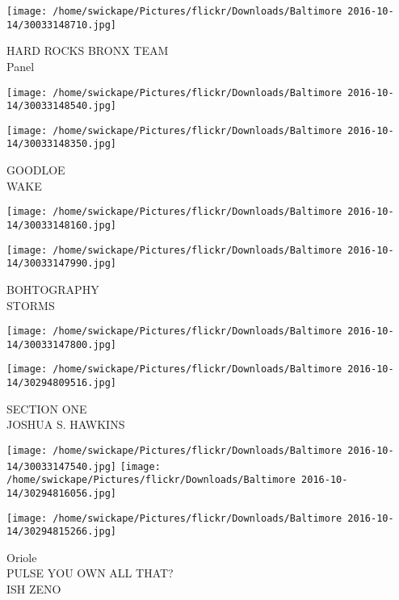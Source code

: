 \documentclass[10pt,letterpaper]{article}
\begin{document}
\vspace{0.25in}
\texttt{[image: /home/swickape/Pictures/flickr/Downloads/Baltimore 2016-10-14/30033148710.jpg]}

HARD ROCKS BRONX TEAM\\
Panel\\
\pagebreak

\texttt{[image: /home/swickape/Pictures/flickr/Downloads/Baltimore 2016-10-14/30033148540.jpg]}

\vspace{0.25in}
\texttt{[image: /home/swickape/Pictures/flickr/Downloads/Baltimore 2016-10-14/30033148350.jpg]}

GOODLOE\\
WAKE\\
\pagebreak

\texttt{[image: /home/swickape/Pictures/flickr/Downloads/Baltimore 2016-10-14/30033148160.jpg]}

\vspace{0.25in}
\texttt{[image: /home/swickape/Pictures/flickr/Downloads/Baltimore 2016-10-14/30033147990.jpg]}

BOHTOGRAPHY\\
STORMS\\
\pagebreak

\texttt{[image: /home/swickape/Pictures/flickr/Downloads/Baltimore 2016-10-14/30033147800.jpg]}

\vspace{0.25in}
\texttt{[image: /home/swickape/Pictures/flickr/Downloads/Baltimore 2016-10-14/30294809516.jpg]}

SECTION ONE\\
JOSHUA S. HAWKINS\\
\pagebreak

\texttt{[image: /home/swickape/Pictures/flickr/Downloads/Baltimore 2016-10-14/30033147540.jpg]}
\texttt{[image: /home/swickape/Pictures/flickr/Downloads/Baltimore 2016-10-14/30294816056.jpg]}

\vspace{0.25in}
\texttt{[image: /home/swickape/Pictures/flickr/Downloads/Baltimore 2016-10-14/30294815266.jpg]}

Oriole\\
PULSE YOU OWN ALL THAT?\\
ISH ZENO\\
\pagebreak
\end{document}
